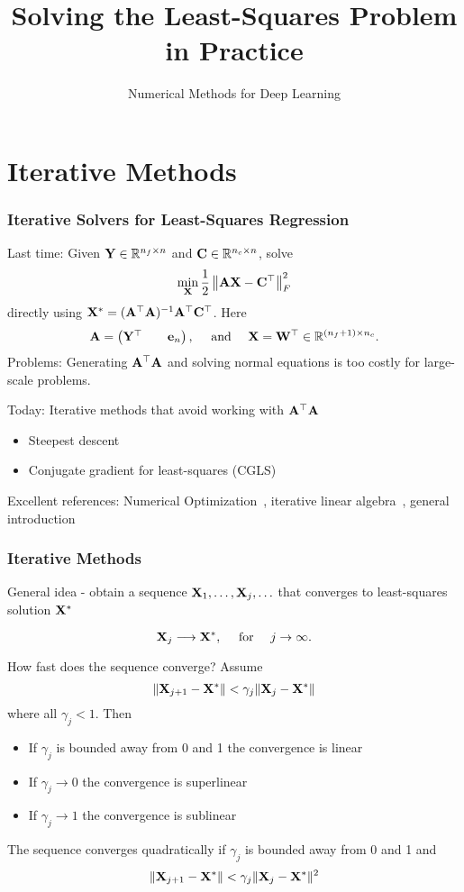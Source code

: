 \documentclass[12pt,fleqn]{beamer}
\title[Iterative LS]{Solving the Least-Squares Problem in Practice}
\subtitle{Numerical Methods for Deep Learning}
\date{}
\begin{document}
\makebeamertitle


\section{Iterative Methods} %
\label{sec:iterative_methods}
\begin{frame}\frametitle{Iterative Solvers for Least-Squares Regression}
	Last time: Given ${\bf Y}\in \mathbb{R}^{n_f\times n}$ and ${\bf C}\in\mathbb{R}^{n_c\times n}$, solve
	$$
	\min_{{\bf X}}  \frac12\left\|  {\bf A}   {\bf X}  -  {\bf C}^\top \right\|_F^2
	$$
	directly using ${\bf X}^* = ({\bf A}^{\top} {\bf A})^{-1}{\bf A}^{\top} {\bf C}^\top$. Here
	$$
		{\bf A} = \begin{pmatrix}
			{\bf Y}^\top && {\bf e}_n
		\end{pmatrix}, \quad \text{ and } \quad 
		{\bf X} = {\bf W}^\top \in \mathbb{R}^{(n_f+1)\times n_c}.
	$$
	Problems: Generating  ${\bf A}^{\top}{\bf A}$ and solving normal equations is too costly for large-scale problems.
	
	\pause

	\bigskip
	
Today: Iterative methods that avoid working with ${\bf A}^{\top}{\bf A}$ 
\begin{itemize}
\item Steepest descent 
\item Conjugate gradient for least-squares (CGLS)
\end{itemize}
Excellent references: Numerical Optimization~\cite{NocedalWright2006}, iterative linear algebra~\cite{Saad2003}, general introduction \cite{AscherGreif2011}
\end{frame}

\begin{frame}\frametitle{Iterative Methods}


General idea - obtain a sequence ${\bf X}_1, \ldots,{\bf X}_j,\ldots$
that converges to least-squares solution ${\bf X}^*$

$$
	{\bf X}_j \longrightarrow {\bf X}^*, \quad \text{ for } \quad j \to \infty.
$$

\bigskip

How fast does the sequence converge? Assume
$$
\|{\bf X}_{j+1} - {\bf X}^* \| < \gamma_j \|{\bf X}_{j} - {\bf X}^* \|
$$ 
where all $\gamma_j < 1$. Then

\begin{itemize}
\item If $\gamma_j$ is bounded away from $0$ and 1 the convergence is linear
\item If $\gamma_j \rightarrow 0$ the convergence is superlinear
\item If $\gamma_j \rightarrow 1$ the convergence is sublinear
\end{itemize}

The sequence converges quadratically if $\gamma_j$ is bounded away from 0 and 1 and 
$$ \|{\bf X}_{j+1} - {\bf X}^* \| < \gamma_j \|{\bf X}_{j} - {\bf X}^* \|^2 $$ 
\end{frame}
\end{document}
